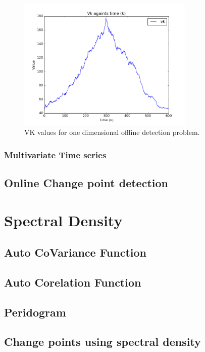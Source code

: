 \documentclass{article}
\begin{document}
\begin{figure}[ht!]
  \centering
  \includegraphics[width=0.75\textwidth]{images/1d_offline/vk}
  \caption{VK values for one dimensional offline detection problem.\label{fig:1d_vk}}
\end{figure}


\subsubsection{Multivariate Time series}

\subsection{Online Change point detection}


\section{Spectral Density}
\subsection{Auto CoVariance Function}
\subsection{Auto Corelation Function}
\subsection{Peridogram}
\subsection{Change points using spectral density}



\end{document}
